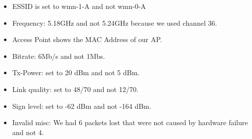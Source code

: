 \begin {itemize}
\item ESSID is set to wmn-1-A and not wmn-0-A
\item Frequency: 5.18GHz and not 5.24GHz because we used channel 36.
\item Access Point shows the MAC Address of our AP.
\item Bitrate: 6Mb/s and not 1Mbs.
\item Tx-Power: set to 20 dBm and not 5 dBm.
\item Link quality: set to 48/70 and not 12/70.
\item Sign level: set to -62 dBm and not -164 dBm.
\item Invalid misc: We had 6 packets lost that were not caused by hardware failure and not 4.
\end{itemize}
